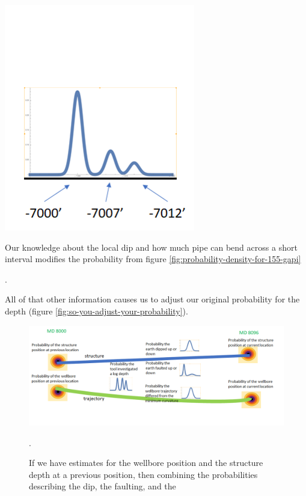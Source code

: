 \documentclass{tufte-handout}
\begin{document}
\begin{marginfigure}[-2in]
  \includegraphics{so-you-adjust-your-probability.png}
   \caption{Our knowledge about the local dip and how much pipe can bend across a short interval 
  modifies the probability from figure \ref{fig:probability-density-for-155-gapi}}.
  \label{fig:so-you-adjust-your-probability}
\end{marginfigure}

All of that other information causes us to adjust our original probability for the 
depth (figure \ref{fig:so-you-adjust-your-probability}).

\begin{figure}
    \includegraphics[width=\linewidth]{neighboring-stations.png}
    \caption{If we have estimates for the wellbore position and the structure depth at a previous
    position, then combining the probabilities describing the dip, the faulting, and the }.
    \label{fig:neighboring-stations}
\end{figure}

\end{document}
